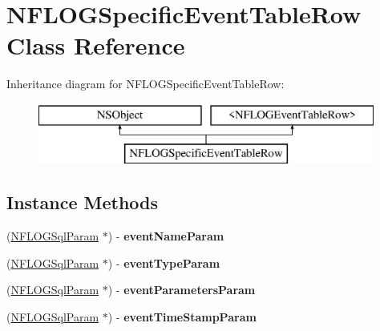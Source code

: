 \hypertarget{interface_n_f_l_o_g_specific_event_table_row}{}\section{N\+F\+L\+O\+G\+Specific\+Event\+Table\+Row Class Reference}
\label{interface_n_f_l_o_g_specific_event_table_row}
Inheritance diagram for N\+F\+L\+O\+G\+Specific\+Event\+Table\+Row\+:\begin{figure}[H]
\begin{center}
\leavevmode
\includegraphics[height=2.000000cm]{interface_n_f_l_o_g_specific_event_table_row}
\end{center}
\end{figure}
\subsection*{Instance Methods}
\begin{DoxyCompactItemize}
\item 
\mbox{\label{interface_n_f_l_o_g_specific_event_table_row_af26dfc40c0843d7eb92995d017a6bd1a}} 
(\hyperlink{interface_n_f_l_o_g_sql_param}{N\+F\+L\+O\+G\+Sql\+Param} $\ast$) -\/ {\bfseries event\+Name\+Param}
\item 
\mbox{\label{interface_n_f_l_o_g_specific_event_table_row_a8071573eaa76a26bfdff0eeeca1af540}} 
(\hyperlink{interface_n_f_l_o_g_sql_param}{N\+F\+L\+O\+G\+Sql\+Param} $\ast$) -\/ {\bfseries event\+Type\+Param}
\item 
\mbox{\label{interface_n_f_l_o_g_specific_event_table_row_aa903986a2002bb91f2332aa2296d23bd}} 
(\hyperlink{interface_n_f_l_o_g_sql_param}{N\+F\+L\+O\+G\+Sql\+Param} $\ast$) -\/ {\bfseries event\+Parameters\+Param}
\item 
\mbox{\label{interface_n_f_l_o_g_specific_event_table_row_a879a014e4f04767a398c8c1206e4be57}} 
(\hyperlink{interface_n_f_l_o_g_sql_param}{N\+F\+L\+O\+G\+Sql\+Param} $\ast$) -\/ {\bfseries event\+Time\+Stamp\+Param}
\end{DoxyCompactItemize}
